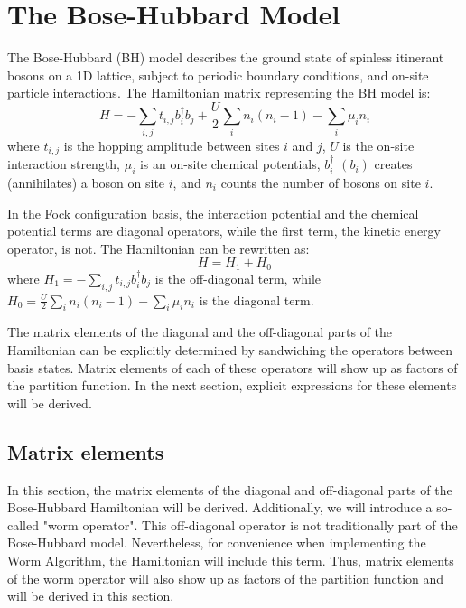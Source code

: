 \documentclass[12pt, two sided]{article}
\begin{document}


\section{The Bose-Hubbard Model}

The Bose-Hubbard (BH) model describes the ground state of spinless itinerant bosons on a 1D lattice, subject to periodic boundary conditions, and on-site particle interactions. The Hamiltonian matrix representing the BH model is:
%
\begin{equation}
\label{eq:bh_hamiltonian}
H = - \sum_{ i,j } t_{i,j} b_i^{\dag} b_j + \frac{U}{2} \sum_i n_i (n_i-1) - \sum_i \mu_i n_i
\end{equation}
%
where $t_{i,j}$ is the hopping amplitude between sites $i$ and $j$, $U$ is the on-site interaction strength, $\mu_i$ is an on-site chemical potentials,  $b_i^{\dag}$ $(b_i)$ creates (annihilates) a boson on site $i$, and $n_i$ counts the number of bosons on site $i$. 

In the Fock configuration basis, the interaction potential and the chemical potential terms are diagonal operators, while the first term, the kinetic energy operator, is not. The Hamiltonian can be rewritten as:
%
\begin{equation}
H = H_1 + H_0
\end{equation}
%
where $H_1 = - \sum_{i,j} t_{i,j} b_i^{\dag} b_j$ is the off-diagonal term, while $H_0 = \frac{U}{2} \sum_i n_i (n_i-1) - \sum_i \mu_i n_i$ is the diagonal term.

The matrix elements of the diagonal and the off-diagonal parts of the Hamiltonian can be explicitly determined by sandwiching the operators between basis states. Matrix elements of each of these operators will show up as factors of the partition function. In the next section, explicit expressions for these elements will be derived.

\subsection{Matrix elements}

In this section, the matrix elements of the diagonal and off-diagonal parts of the Bose-Hubbard Hamiltonian will be derived. Additionally, we will introduce a so-called "worm operator". This off-diagonal operator is not traditionally part of the Bose-Hubbard model. Nevertheless, for convenience when implementing the Worm Algorithm, the Hamiltonian will include this term. Thus, matrix elements of the worm operator will also show up as factors of the partition function and will be derived in this section.
\end{document}
